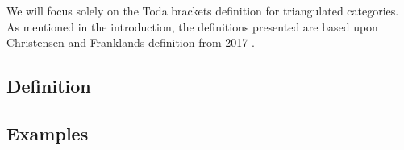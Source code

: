 We will focus solely on the Toda brackets definition for triangulated categories. As mentioned in the introduction, the definitions presented are based upon Christensen and Franklands definition from 2017 \cite[Definition 3.1]{Christensen-Frankland_2017}.

\subsection{Definition}


\subsection{Examples}
